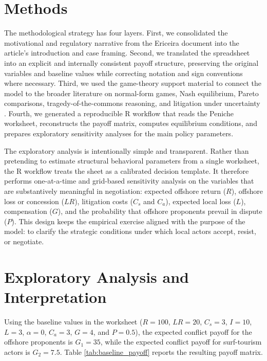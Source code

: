 \documentclass[final,times,authoryear]{elsarticle}
\begin{document}


\section{Methods}
\label{sec_methods}

The methodological strategy has four layers. First, we consolidated the motivational and regulatory narrative from the Ericeira document into the article's introduction and case framing. Second, we translated the spreadsheet into an explicit and internally consistent payoff structure, preserving the original variables and baseline values while correcting notation and sign conventions where necessary. Third, we used the game-theory support material to connect the model to the broader literature on normal-form games, Nash equilibrium, Pareto comparisons, tragedy-of-the-commons reasoning, and litigation under uncertainty \citep{Bebchuk1984,gillman2019,hardin1968tragedy,ostrom_2015,sobhee_game_2017}. Fourth, we generated a reproducible R workflow that reads the Peniche worksheet, reconstructs the payoff matrix, computes equilibrium conditions, and prepares exploratory sensitivity analyses for the main policy parameters.

The exploratory analysis is intentionally simple and transparent. Rather than pretending to estimate structural behavioral parameters from a single worksheet, the R workflow treats the sheet as a calibrated decision template. It therefore performs one-at-a-time and grid-based sensitivity analysis on the variables that are substantively meaningful in negotiation: expected offshore return ($R$), offshore loss or concession ($LR$), litigation costs ($C_s$ and $C_a$), expected local loss ($L$), compensation ($G$), and the probability that offshore proponents prevail in dispute ($P$). This design keeps the empirical exercise aligned with the purpose of the model: to clarify the strategic conditions under which local actors accept, resist, or negotiate.

\section{Exploratory Analysis and Interpretation}
\label{sec_evaluation}

Using the baseline values in the worksheet ($R=100$, $LR=20$, $C_s=3$, $I=10$, $L=3$, $\alpha=0$, $C_a=3$, $G=4$, and $P=0.5$), the expected conflict payoff for the offshore proponents is $G_1=35$, while the expected conflict payoff for surf-tourism actors is $G_2=7.5$. Table \ref{tab:baseline_payoff} reports the resulting payoff matrix.
\end{document}
